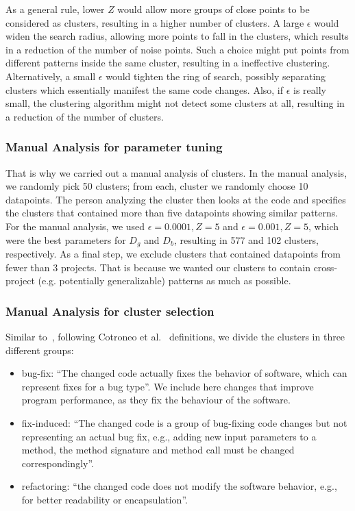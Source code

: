 As a general rule, lower $Z$ would allow more groups of close points to be considered as clusters, resulting in a higher number of clusters. A large $\epsilon$ would widen the search radius, allowing more points to fall in the clusters, which results in a reduction of the number of noise points. Such a choice might put points from different patterns inside the same cluster, resulting in a ineffective clustering. Alternatively, a small $\epsilon$ would tighten the ring of search, possibly separating clusters which essentially manifest the same code changes. Also, if $\epsilon$ is really small, the clustering algorithm might not detect some clusters at all, resulting in a reduction of the number of clusters. 

\subsubsection{\label{sec:manual_analysis_parameter_tuning}Manual Analysis for parameter tuning}

That is why we carried out a manual analysis of clusters. In the manual analysis, we randomly pick 50 clusters; from each, cluster we randomly choose 10 datapoints. The person analyzing the cluster then looks at the code and specifies the clusters that contained more than five datapoints showing similar patterns. For the manual analysis, we used $\epsilon=0.0001, Z=5$ and $\epsilon=0.001, Z=5$, which were the best parameters for $D_g$ and $D_b$, resulting in 577 and 102 clusters, respectively. As a final step, we exclude clusters that contained datapoints from fewer than 3 projects. That is because we wanted our clusters to contain cross-project (e.g. potentially generalizable) patterns as much as possible.  

\subsubsection{\label{sec:manual_analysis_cluster_selection}Manual Analysis for cluster selection}

Similar to~\cite{yang2022mining}, following Cotroneo et al.~\cite{cotroneo2019analyzing} definitions, we divide the clusters in three different groups:

\begin{itemize}
    \item bug-fix: ``The changed code actually fixes the behavior of software, which can represent fixes for a bug type''. We include here changes that improve program performance, as they fix the behaviour of the software.
    
    \item fix-induced: ``The changed code is a group of bug-fixing code changes but not representing an actual bug fix, e.g., adding new input parameters to a method, the method signature and method call must be changed correspondingly''.
    
    \item refactoring: ``the changed code does not modify the software behavior, e.g., for better readability or encapsulation''.
\end{itemize}

